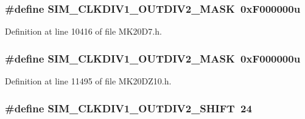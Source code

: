 \subsubsection[{\texorpdfstring{S\+I\+M\+\_\+\+C\+L\+K\+D\+I\+V1\+\_\+\+O\+U\+T\+D\+I\+V2\+\_\+\+M\+A\+SK}{SIM_CLKDIV1_OUTDIV2_MASK}}]{\setlength{\rightskip}{0pt plus 5cm}\#define S\+I\+M\+\_\+\+C\+L\+K\+D\+I\+V1\+\_\+\+O\+U\+T\+D\+I\+V2\+\_\+\+M\+A\+SK~0x\+F000000u}\hypertarget{group___s_i_m___register___masks_gad2d7b5c991f6db7ab2a3e6bc4d9c6aae}{}\label{group___s_i_m___register___masks_gad2d7b5c991f6db7ab2a3e6bc4d9c6aae}


Definition at line 10416 of file M\+K20\+D7.\+h.

\subsubsection[{\texorpdfstring{S\+I\+M\+\_\+\+C\+L\+K\+D\+I\+V1\+\_\+\+O\+U\+T\+D\+I\+V2\+\_\+\+M\+A\+SK}{SIM_CLKDIV1_OUTDIV2_MASK}}]{\setlength{\rightskip}{0pt plus 5cm}\#define S\+I\+M\+\_\+\+C\+L\+K\+D\+I\+V1\+\_\+\+O\+U\+T\+D\+I\+V2\+\_\+\+M\+A\+SK~0x\+F000000u}\hypertarget{group___s_i_m___register___masks_gad2d7b5c991f6db7ab2a3e6bc4d9c6aae}{}\label{group___s_i_m___register___masks_gad2d7b5c991f6db7ab2a3e6bc4d9c6aae}


Definition at line 11495 of file M\+K20\+D\+Z10.\+h.

\subsubsection[{\texorpdfstring{S\+I\+M\+\_\+\+C\+L\+K\+D\+I\+V1\+\_\+\+O\+U\+T\+D\+I\+V2\+\_\+\+S\+H\+I\+FT}{SIM_CLKDIV1_OUTDIV2_SHIFT}}]{\setlength{\rightskip}{0pt plus 5cm}\#define S\+I\+M\+\_\+\+C\+L\+K\+D\+I\+V1\+\_\+\+O\+U\+T\+D\+I\+V2\+\_\+\+S\+H\+I\+FT~24}\hypertarget{group___s_i_m___register___masks_ga6d6fd31143c3871c916062966b6fbc3b}{}\label{group___s_i_m___register___masks_ga6d6fd31143c3871c916062966b6fbc3b}


